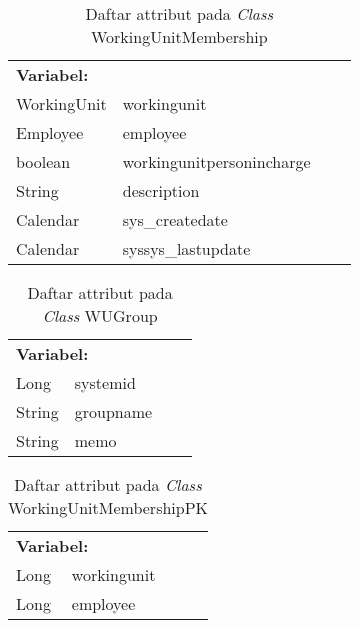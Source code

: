 \begin{table}[H]
	\caption{Daftar attribut pada \textit{Class} WorkingUnitMembership}
	\centering
	\small
	\begin{adjustbox}{width=1\textwidth}	
		\begin{tabular}{|p{4cm} p{2.1cm} p{3cm} p{3.1cm}|}
			\hline
			\multicolumn{2}{|l}{\textbf{Variabel:}}&\multicolumn{2}{l|}{}\\
			WorkingUnit&workingunit&&\\
			Employee&employee&&\\
			boolean&workingunitpersonincharge&&\\
			String&description&&\\
			Calendar&sys\_createdate&&\\
			Calendar&syssys\_lastupdate&&\\
			\hline
		\end{tabular}
	\end{adjustbox}
\end{table}
\begin{table}[H]
	\caption{Daftar attribut pada \textit{Class} WUGroup}
	\centering
	\small
	\begin{adjustbox}{width=1\textwidth}	
		\begin{tabular}{|p{4cm} p{2.1cm} p{3cm} p{3.1cm}|}
			\hline
			\multicolumn{2}{|l}{\textbf{Variabel:}}&\multicolumn{2}{l|}{}\\
			Long&systemid&&\\
			String&groupname&&\\
			String&memo&&\\
			\hline
		\end{tabular}
	\end{adjustbox}
\end{table}
\begin{table}[H]
	\caption{Daftar attribut pada \textit{Class} WorkingUnitMembershipPK}
	\centering
	\small
	\begin{adjustbox}{width=1\textwidth}	
		\begin{tabular}{|p{4cm} p{2.1cm} p{3cm} p{3.1cm}|}
			\hline
			\multicolumn{2}{|l}{\textbf{Variabel:}}&\multicolumn{2}{l|}{}\\
			Long&workingunit&&\\
			Long&employee&&\\
			\hline
		\end{tabular}
	\end{adjustbox}
\end{table}
